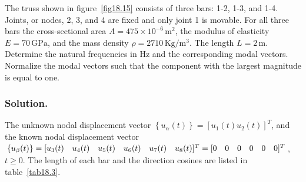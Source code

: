 \documentclass{AeroStructure-ERJohnson}
\begin{document}
\pagebreak

\begin{example}\label{ex18.3}\setcounter{equation}{0}\def\theequation{\alph{equation}}The truss shown in figure~\ref{fig18.15} consists of three bars: 1-2, 1-3, and 1-4. Joints, or nodes, 2, 3, and 4 are fixed and only joint 1 is movable. For all three bars the cross-sectional area $A=475 \times 10^{-6}\,\mathrm{m}^{2}$, the modulus of elasticity $E=70\,\mathrm{GPa}$, and the mass density $\rho=2710\,\mathrm{Kg}/\mathrm{m}^{3}$. The length $L=2\,\mathrm{m}$. Determine the natural frequencies in Hz and the corresponding modal vectors. Normalize the modal vectors such that the component with the largest magnitude is equal to one.

\vspace*{-1\baselineskip}
{\def\thefigure{18.15}
}

\subsubsection{Solution.} The unknown nodal displacement vector $\left\{u_{\alpha}(t)\right\}=\left[u_{1}(t) u_{2}(t)\right]^{T}$, and the known nodal displacement vector $\{u_{\beta}(t)\}=[\begin{array}{@{}llllll@{}}u_{3}(t) & u_{4}(t) & u_{5}(t) & u_{6}(t) & u_{7}(t) & u_{8}(t)\end{array}]^{T}=[\begin{array}{@{}llllll@{}}0 & 0 & 0 & 0 & 0 & 0
\end{array}]^{T}$, $t \geq 0$. The length of each bar and the direction cosines are listed in table~\ref{tab18.3}.


\end{example}
\end{document}
